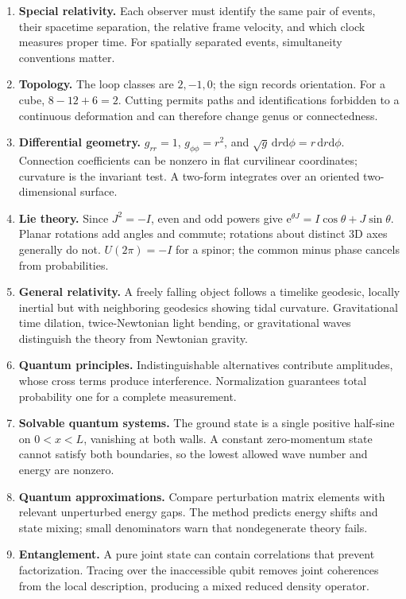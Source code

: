 \documentclass[11pt,oneside]{book}
\newcommand{\dd}{\mathrm{d}}
\newcommand{\ee}{\mathrm{e}}
\theoremstyle{reviewstyle}
\begin{document}
\begin{enumerate}
\item \textbf{Special relativity.} Each observer must identify the same pair of events, their spacetime separation, the relative frame velocity, and which clock measures proper time. For spatially separated events, simultaneity conventions matter.
\item \textbf{Topology.} The loop classes are $2,-1,0$; the sign records orientation. For a cube, $8-12+6=2$. Cutting permits paths and identifications forbidden to a continuous deformation and can therefore change genus or connectedness.
\item \textbf{Differential geometry.} $g_{rr}=1$, $g_{\phi\phi}=r^2$, and $\sqrt{g}\,\dd r\dd\phi=r\,\dd r\dd\phi$. Connection coefficients can be nonzero in flat curvilinear coordinates; curvature is the invariant test. A two-form integrates over an oriented two-dimensional surface.
\item \textbf{Lie theory.} Since $J^2=-I$, even and odd powers give $\ee^{\theta J}=I\cos\theta+J\sin\theta$. Planar rotations add angles and commute; rotations about distinct 3D axes generally do not. $U(2\pi)=-I$ for a spinor; the common minus phase cancels from probabilities.
\item \textbf{General relativity.} A freely falling object follows a timelike geodesic, locally inertial but with neighboring geodesics showing tidal curvature. Gravitational time dilation, twice-Newtonian light bending, or gravitational waves distinguish the theory from Newtonian gravity.
\item \textbf{Quantum principles.} Indistinguishable alternatives contribute amplitudes, whose cross terms produce interference. Normalization guarantees total probability one for a complete measurement.
\item \textbf{Solvable quantum systems.} The ground state is a single positive half-sine on $0<x<L$, vanishing at both walls. A constant zero-momentum state cannot satisfy both boundaries, so the lowest allowed wave number and energy are nonzero.
\item \textbf{Quantum approximations.} Compare perturbation matrix elements with relevant unperturbed energy gaps. The method predicts energy shifts and state mixing; small denominators warn that nondegenerate theory fails.
\item \textbf{Entanglement.} A pure joint state can contain correlations that prevent factorization. Tracing over the inaccessible qubit removes joint coherences from the local description, producing a mixed reduced density operator.

\end{enumerate}
\end{document}
